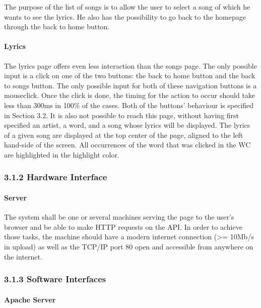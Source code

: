 \documentclass[]{article}
\begin{document}
The purpose of the list of songs is to allow the user to select a song
of which he wants to see the lyrics. He also has the possibility to go
back to the homepage through the back to home button.

\paragraph{Lyrics}\label{lyrics}

The lyrics page offers even less interaction than the songs page. The
only possible input is a click on one of the two buttons: the back to
home button and the back to songs button. The only possible input for
both of these navigation buttons is a mouseclick. Once the click is
done, the timing for the action to occur should take less than 300ms in
100\% of the cases. Both of the buttons' behaviour is specified in
Section 3.2. It is also not possible to reach this page, without having
first specified an artist, a word, and a song whose lyrics will be
displayed. The lyrics of a given song are displayed at the top center of
the page, aligned to the left hand-side of the screen. All occurrences
of the word that was clicked in the WC are highlighted in the highlight
color.

\subsubsection{3.1.2 Hardware Interface}\label{hardware-interface}

\paragraph{Server}\label{server}

The system shall be one or several machines serving the page to the
user's browser and be able to make HTTP requests on the API. In order to
achieve those tasks, the machine should have a modern internet
connection (\textgreater{}= 10Mb/s in upload) as well as the TCP/IP port
80 open and accessible from anywhere on the internet.

\subsubsection{3.1.3 Software Interfaces}\label{software-interfaces-1}

\paragraph{Apache Server}\label{apache-server}
\end{document}
